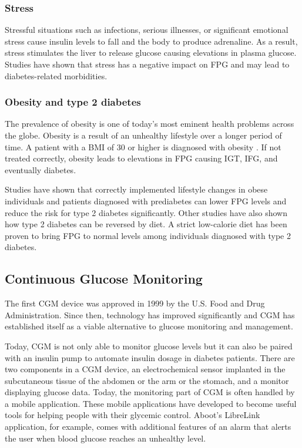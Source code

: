 \documentclass[english, 12pt, a4paper, elec, utf8, a-1b, online]{aaltothesis}
\begin{document}
\subsubsection{Stress}
Stressful situations such as infections, serious illnesses, or significant emotional stress
cause insulin levels to fall and the body to produce adrenaline. As a result, stress 
stimulates the liver to release glucose causing elevations in plasma glucose\cite{stress_glucose}. 
Studies have shown that stress has a negative impact on FPG and may lead to diabetes-related
morbidities\cite{yitshak-sade_association_2020}.

\subsubsection{Obesity and type 2 diabetes}
The prevalence of obesity is one of today's most eminent health problems across the globe\cite{chooi_epidemiology_2019}. 
Obesity is a result of an unhealthy lifestyle over a longer period of time. A patient with a BMI of 30 or higher
is diagnosed with obesity \cite{jequer_pathways}. If not treated correctly, obesity 
leads to elevations in FPG causing IGT, IFG, and eventually diabetes\cite{garber_obesity_2012}. 

Studies have shown that correctly implemented lifestyle changes in obese individuals and patients 
diagnosed with prediabetes can lower FPG levels and reduce the risk for type 2 diabetes 
significantly\cite{taylor_type_2013}\cite{walker_diet_2010}. Other studies have also shown 
how type 2 diabetes can be reversed by diet\cite{taylor_type_2013}. A strict low-calorie diet
has been proven to bring FPG to normal levels among individuals diagnosed with type 2 diabetes\cite{taylor_type_2013}. 

\subsection{Continuous Glucose Monitoring}
The first CGM device was approved in 1999 by the U.S. Food and Drug Administration. Since then, 
technology has improved significantly and CGM has established itself as a viable alternative to 
glucose monitoring and management\cite{garg_new_2018}. 

Today, CGM is not only able to monitor glucose levels 
but it can also be paired with an insulin pump to automate insulin dosage in diabetes patients\cite{vettoretti_combining_2019}. 
There are two components in a CGM device, an electrochemical sensor implanted in the subcutaneous 
tissue of the abdomen or the arm or the stomach, and a monitor displaying glucose data\cite{vettoretti_combining_2019}. 
Today, the monitoring part of CGM is often handled by a mobile application. These mobile applications have developed to 
become useful tools for helping people with their glycemic control. Aboot's LibreLink application, for example, 
comes with additional features of an alarm that alerts the user when blood glucose reaches an unhealthy level\cite{librelink}. 
\end{document}

